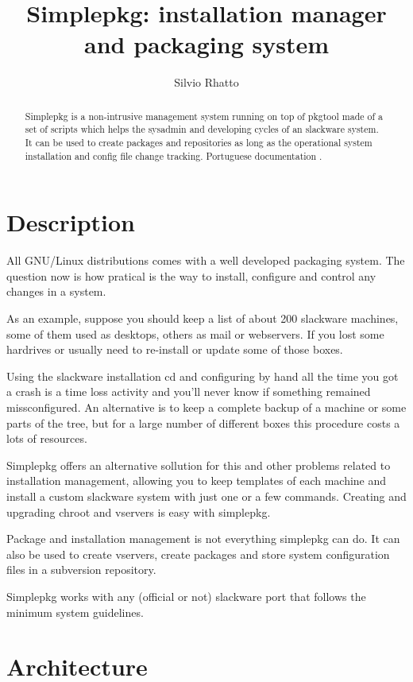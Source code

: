 \documentclass{article}
\title{Simplepkg: installation manager and packaging system}
\author{Silvio Rhatto}
\begin{document}
\label{start}
\maketitle

\begin{abstract}
Simplepkg is a non-intrusive management system running on top of pkgtool made of a set of scripts which helps the sysadmin and developing cycles of an slackware system.  It can be used to create packages and repositories as long as the operational system installation and config file change tracking. Portuguese documentation .
\end{abstract}

\section{Description}

All GNU/Linux distributions comes with a well developed packaging system. The question now is how pratical is the way to install, configure and control any changes in a system.

As an example, suppose you should keep a list of about 200 slackware machines, some of them used as desktops, others as mail or webservers. If you lost some hardrives or usually need to re-install or update some of those boxes.

Using the slackware installation cd and configuring by hand all the time you got a crash is a time loss activity and you'll never know if something remained missconfigured. An alternative is to keep a complete backup of a machine or some parts of the tree, but for a large number of different boxes this procedure costs a lots of resources.

Simplepkg offers an alternative sollution for this and other problems related to installation management, allowing you to keep templates of each machine and install a custom slackware system with just one or a few commands. Creating and upgrading chroot and vservers is easy with simplepkg.

Package and installation management is not everything simplepkg can do. It can also be used to create vservers, create packages and store system configuration files in a subversion repository.

Simplepkg works with any (official or not) slackware port that follows the minimum system guidelines.

\section{Architecture}
\end{document}
